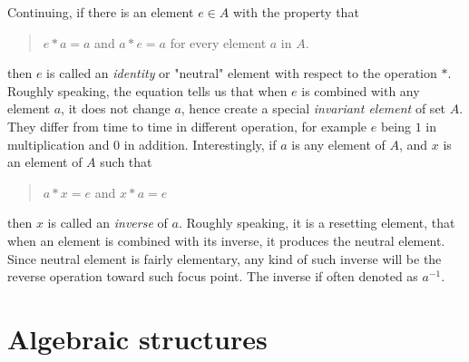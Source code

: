Continuing, if there is an element $e\in A$ with the property that 
\begin{quote}
    $e*a=a$ and $a*e=a$ for every element $a$ in $A$. 
\end{quote}
then $e$ is called an \textit{identity} or "neutral" element with respect to the operation $*$. Roughly speaking, the equation tells us that when $e$ is combined with any element $a$, it does not change $a$, hence create a special \textit{invariant element} of set $A$. They differ from time to time in different operation, for example $e$ being $1$ in multiplication and $0$ in addition. Interestingly, if $a$ is any element of $A$, and $x$ is an element of $A$ such that
\begin{quote}
    $a*x = e$ and $x*a = e$
\end{quote}
then $x$ is called an \textit{inverse} of $a$. Roughly speaking, it is a resetting element, that when an element is combined with its inverse, it produces the neutral element. Since neutral element is fairly elementary, any kind of such inverse will be the reverse operation toward such focus point. The inverse if often denoted as $a^{-1}$. 

\section{Algebraic structures}


